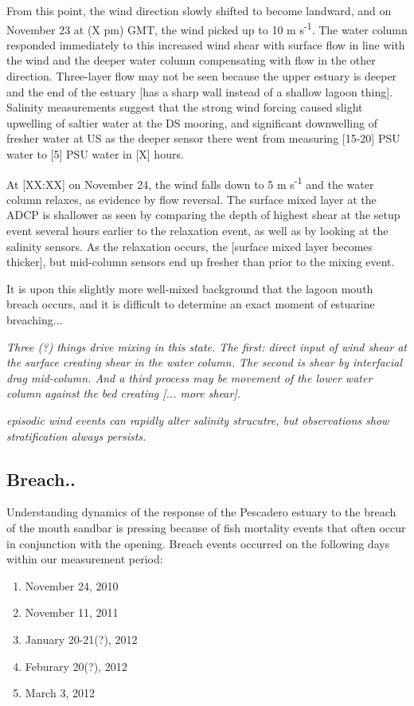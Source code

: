{From this point, the wind direction slowly shifted to become landward, and on November 23 at (X pm) GMT, the wind picked up to 10 m s\textsuperscript{-1}. The water column responded immediately to this increased wind shear with surface flow in line with the wind and the  deeper water column compensating with flow in the other direction. Three-layer flow may not be seen because the upper estuary is deeper and the end of the estuary [has a sharp wall instead of a shallow lagoon thing]. Salinity measurements suggest that the strong wind forcing caused slight upwelling of saltier water at the DS mooring, and significant downwelling of fresher water at US as the deeper sensor there went from measuring [15-20] PSU water to [5] PSU water in [X] hours.

At [XX:XX] on November 24, the wind falls down to 5 m
s\textsuperscript{-1} and the water column relaxes, as evidence by flow
reversal. The surface mixed layer at the ADCP is shallower as seen by
comparing the depth of highest shear at the setup event several hours
earlier to the relaxation event, as well as by looking at the salinity
sensors. As the relaxation occurs, the [surface mixed layer becomes
thicker], but mid-column sensors end up fresher than prior to the mixing
event.

It is upon this slightly more well-mixed background that the lagoon
mouth breach occurs, and it is difficult to determine an exact moment of
estuarine breaching...

\emph{Three (?) things drive mixing in this state. The first: direct input of wind shear at the surface creating shear in the water column.  The second is shear by interfacial drag mid-column. And a third process may be movement of the lower water column against the bed creating [... more shear].}


\emph{episodic wind events can rapidly alter salinity strucutre, but observations show stratification always persists.}

\subsection{Breach.. } \label{breach_dynamics}
Understanding dynamics of the response of the Pescadero estuary to the breach of the mouth sandbar is pressing because of fish mortality events that often occur in conjunction with the opening. Breach events occurred on the following days within our measurement period:
\begin{enumerate}
	\item November 24, 2010
	\item November 11, 2011
	\item January 20-21(?), 2012
	\item Feburary 20(?), 2012
	\item March 3, 2012
\end{enumerate}

}

